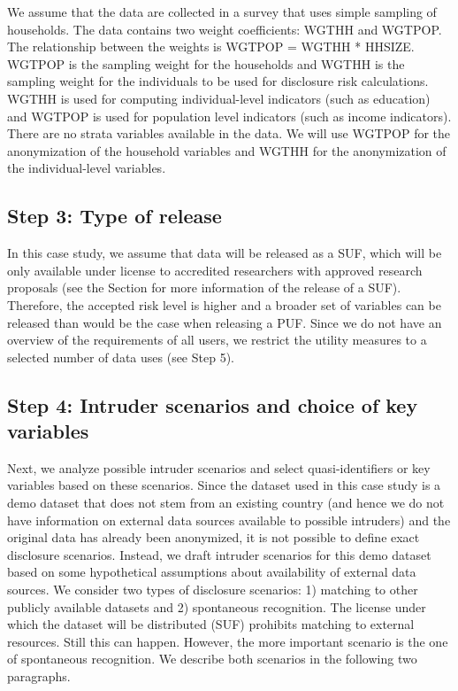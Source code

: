 \documentclass[letterpaper,10pt,english]{sphinxmanual}
\begin{document}
We assume that the data are collected in a survey that uses simple
sampling of households. The data contains two weight coefficients: WGTHH
and WGTPOP. The relationship between the weights is WGTPOP = WGTHH *
HHSIZE. WGTPOP is the sampling weight for the households and WGTHH is
the sampling weight for the individuals to be used for disclosure risk
calculations. WGTHH is used for computing individual-level indicators
(such as education) and WGTPOP is used for population level indicators
(such as income indicators). There are no strata variables available in
the data. We will use WGTPOP for the anonymization of the household
variables and WGTHH for the anonymization of the individual-level
variables.


\subsection{Step 3: Type of release}
\label{\detokenize{casestudies:step-3-type-of-release}}
In this case study, we assume that data will be released as a SUF, which
will be only available under license to accredited researchers with
approved research proposals (see the Section
for more information of the
release of a SUF). Therefore, the accepted risk level is higher and a
broader set of variables can be released than would be the case when
releasing a PUF. Since we do not have an overview of the requirements of
all users, we restrict the utility measures to a selected number of data
uses (see Step 5).


\subsection{Step 4: Intruder scenarios and choice of key variables}
\label{\detokenize{casestudies:step-4-intruder-scenarios-and-choice-of-key-variables}}
Next, we analyze possible intruder scenarios and select
quasi-identifiers or key variables based on these scenarios. Since the
dataset used in this case study is a demo dataset that does not stem
from an existing country (and hence we do not have information on
external data sources available to possible intruders) and the original
data has already been anonymized, it is not possible to define exact
disclosure scenarios. Instead, we draft intruder scenarios for this demo
dataset based on some hypothetical assumptions about availability of
external data sources. We consider two types of disclosure scenarios: 1)
matching to other publicly available datasets and 2) spontaneous
recognition. The license under which the dataset will be distributed
(SUF) prohibits matching to external resources. Still this can happen.
However, the more important scenario is the one of spontaneous
recognition. We describe both scenarios in the following two paragraphs.
\end{document}
